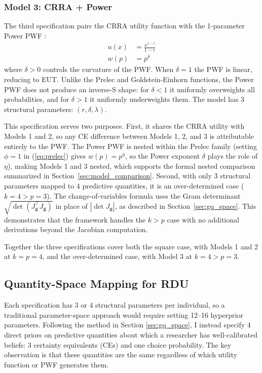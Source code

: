 \documentclass[12pt,a4paper]{article}
\theoremstyle{definition}
\theoremstyle{remark}
\newcommand{\bg}{\mathbf{g}}
\begin{document}
\subsubsection*{Model 3: CRRA + Power}

The third specification pairs the CRRA utility function with the 1-parameter
Power PWF \parencite{Quiggin1982}:
\begin{align}
  \label{eq:power_pwf}
  u(x) &= \frac{x^{1-r}}{1 - r} \\
  w(p) &= p^\delta
\end{align}
where $\delta > 0$ controls the curvature of the PWF\@. When $\delta = 1$ the
PWF is linear, reducing to EUT\@. Unlike the Prelec and Goldstein-Einhorn
functions, the Power PWF does not produce an inverse-S shape: for $\delta < 1$
it uniformly overweights all probabilities, and for $\delta > 1$ it uniformly
underweights them. The model has 3 structural parameters:
$(r, \delta, \lambda)$.

This specification serves two purposes. First, it shares the CRRA utility with
Models 1 and 2, so any CE difference between Models 1, 2, and 3 is
attributable entirely to the PWF\@. The Power PWF is nested within the Prelec
family (setting $\phi = 1$ in (\ref{eq:prelec}) gives $w(p) = p^\eta$, so the
Power exponent $\delta$ plays the role of $\eta$), making
Models 1 and 3 nested, which supports the formal nested comparison
summarized in Section~\ref{sec:model_comparison}. Second, with only 3 structural parameters mapped to 4 predictive
quantities, it is an over-determined case ($k = 4 > p = 3$). The
change-of-variables formula uses the Gram determinant
$\sqrt{\det(J_\bg^\top J_\bg)}$ in place of $|\det J_\bg|$, as described in
Section~\ref{sec:gq_space}. This demonstrates that the framework handles the
$k > p$ case with no additional derivations beyond the Jacobian computation.

Together the three specifications cover both the square case, with Models 1
and 2 at $k = p = 4$, and the over-determined case, with Model 3 at
$k = 4 > p = 3$.



\subsection{Quantity-Space Mapping for RDU}
\label{sec:ce_space}

Each specification has 3 or 4 structural parameters per individual, so a
traditional parameter-space approach would require setting
12--16 hyperprior parameters. Following the method in Section \ref{sec:gq_space}, I
instead specify 4 direct priors on predictive quantities about which a
researcher has well-calibrated beliefs: 3 certainty equivalents (CEs) and one
choice probability. The key observation is that these quantities are the same
regardless of which utility function or PWF generates them.
\end{document}
